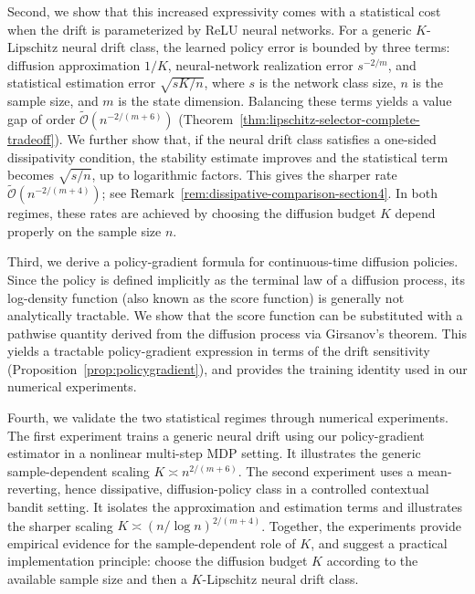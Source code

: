 \documentclass{article}
\newcommand{\1}{\mathbbm{1}}
\numberwithin{equation}{section}
\begin{document}
Second, we show that this increased expressivity comes with a statistical cost when the drift is parameterized by ReLU neural networks. For a generic \(K\)-Lipschitz
neural drift class, the learned policy error is bounded by three terms:
diffusion approximation  \(1/K\), neural-network realization error  \(s^{-2/m}\),
and statistical estimation error  \(\sqrt{sK/n}\), where \(s\) is the network
class size, \(n\) is the sample size, and \(m\) is the state dimension. Balancing these terms yields a value gap of order
\(\widetilde{\mathcal O}(n^{-2/(m+6)})\)
(Theorem~\ref{thm:lipschitz-selector-complete-tradeoff}). We further show that,
if the neural drift class satisfies a one-sided dissipativity condition, the
stability estimate improves and the statistical term becomes \(\sqrt{s/n}\), up
to logarithmic factors. This gives the sharper rate
\(\widetilde{\mathcal O}(n^{-2/(m+4)})\); see
Remark~\ref{rem:dissipative-comparison-section4}. In both regimes, these rates are achieved by choosing the diffusion budget \(K\) depend properly on the sample size \(n\).

Third, we derive a policy-gradient formula for continuous-time diffusion
policies. Since the policy is defined implicitly as the
terminal law of a diffusion process, its log-density function (also known as the score function)   is generally not analytically tractable.  We show that
the score function can be substituted with a pathwise quantity derived from the diffusion process via Girsanov's theorem. This yields a tractable policy-gradient expression in terms of the drift sensitivity 
(Proposition~\ref{prop:policygradient}), and provides the training identity used in our numerical experiments.

Fourth, we validate the two statistical regimes through numerical experiments.
The first experiment trains a generic neural drift 
using our policy-gradient estimator in a nonlinear multi-step MDP setting. It illustrates the generic
sample-dependent scaling \(K\asymp n^{2/(m+6)}\). The second experiment uses a
mean-reverting, hence dissipative, diffusion-policy class in a controlled
contextual bandit setting. It isolates the approximation and estimation terms and
illustrates the sharper scaling \(K\asymp (n/\log n)^{2/(m+4)}\). Together,
the experiments provide empirical evidence for the sample-dependent role of \(K\), and suggest a practical implementation principle: choose the
diffusion budget \(K\) according to the available sample size and then a    $K$-Lipschitz  neural drift class.  
\end{document}
